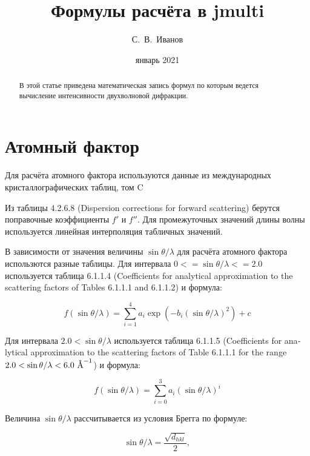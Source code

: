 \documentclass[12pt,a4paper,draft]{article}
\title{Формулы расчёта в jmulti}
\author{С.~В.~Иванов}
\date{январь 2021}
\newcommand{\angstrom}{\textup{\AA}}
\begin{document}
\maketitle

\tableofcontents

\begin{abstract}
    В этой статье приведена математическая запись формул по которым ведется
    вычисление интенсивности двухволновой дифракции.
\end{abstract}

\section{Атомный фактор}

Для расчёта атомного фактора используются данные из международных
кристаллографических таблиц, том C \cite{itcC}


Из таблицы 4.2.6.8 (\textenglish{Dispersion corrections for forward scattering})
берутся поправочные коэффициенты $f'$ и $f''$. Для промежуточных значений длины
волны используется линейная интерполяция табличных значений.


В зависимости от значения величины $ \sin \theta / \lambda $ для расчёта атомного
фактора использются разные таблицы.
Для интервала $ 0 <= \sin \theta / \lambda <= 2.0 $ используется таблица
6.1.1.4 (\textenglish{Coefficients for analytical approximation to the scattering
factors of Tables 6.1.1.1 and 6.1.1.2}) и формула:

\begin{equation}
    f(\sin \theta  / \lambda) = \sum_{i=1}^{4} a_i \exp(-b_i(\sin \theta / \lambda)^2) + c
\end{equation}

Для интервала $ 2.0 < \sin \theta / \lambda $ используется таблица 6.1.1.5
(\textenglish{Coefficients for analytical approximation to the
scattering factors of Table 6.1.1.1 for the range
$2.0 <\sin \theta / \lambda < 6.0~\angstrom^{-1}$}) и формула:

\begin{equation}
    f(\sin \theta / \lambda) = \sum_{i=0}^{3} a_i (\sin \theta / \lambda)^i
\end{equation}

Величина $ \sin \theta / \lambda $ рассчитывается из условия Брегга по формуле:

\begin{equation}
    \sin \theta / \lambda = \frac{\sqrt{d_{hkl}}}{2},
\end{equation}
\end{document}
